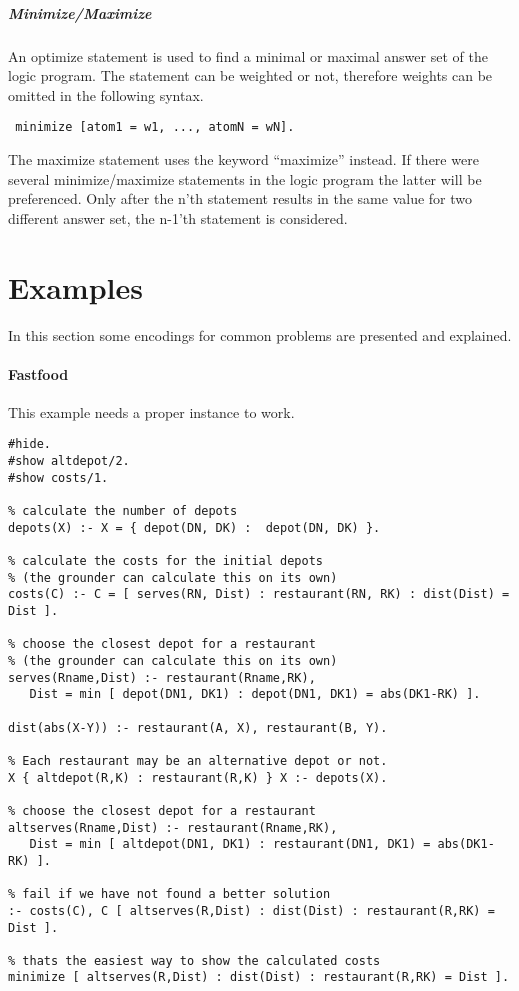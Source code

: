\documentclass[a4paper,10pt]{article}
\begin{document}
\subparagraph{Minimize/Maximize}
An optimize statement is used to find a minimal or maximal answer set of the logic program.
The statement can be weighted or not, therefore weights can be omitted in the following syntax.
\begin{verbatim}
 minimize [atom1 = w1, ..., atomN = wN].
\end{verbatim}
The maximize statement uses the keyword ``maximize'' instead.
If there were several minimize/maximize statements in the logic program the latter will be preferenced.
Only after the n'th statement results in the same value for two different answer set, the n-1'th statement is considered.


\section{Examples}
In this section some encodings for common problems are presented and explained.
\paragraph{Fastfood}
This example needs a proper instance to work.
\begin{verbatim}
#hide.
#show altdepot/2.
#show costs/1.

% calculate the number of depots
depots(X) :- X = { depot(DN, DK) :  depot(DN, DK) }.

% calculate the costs for the initial depots
% (the grounder can calculate this on its own)
costs(C) :- C = [ serves(RN, Dist) : restaurant(RN, RK) : dist(Dist) = Dist ].

% choose the closest depot for a restaurant
% (the grounder can calculate this on its own)
serves(Rname,Dist) :- restaurant(Rname,RK),
   Dist = min [ depot(DN1, DK1) : depot(DN1, DK1) = abs(DK1-RK) ].

dist(abs(X-Y)) :- restaurant(A, X), restaurant(B, Y).

% Each restaurant may be an alternative depot or not.
X { altdepot(R,K) : restaurant(R,K) } X :- depots(X).

% choose the closest depot for a restaurant
altserves(Rname,Dist) :- restaurant(Rname,RK),
   Dist = min [ altdepot(DN1, DK1) : restaurant(DN1, DK1) = abs(DK1-RK) ].

% fail if we have not found a better solution
:- costs(C), C [ altserves(R,Dist) : dist(Dist) : restaurant(R,RK) = Dist ].

% thats the easiest way to show the calculated costs
minimize [ altserves(R,Dist) : dist(Dist) : restaurant(R,RK) = Dist ].
\end{verbatim}
\end{document}
